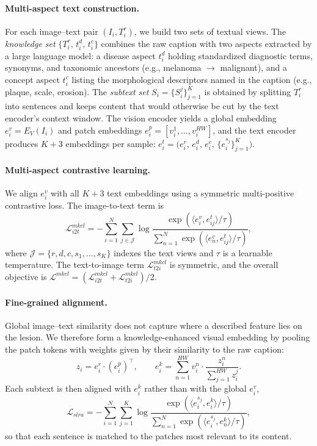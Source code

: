\documentclass{article}
\begin{document}
\paragraph{Multi-aspect text construction.}
For each image--text pair $(I_i, T_i^r)$, we build two sets of textual views. The \emph{knowledge set} $\{T_i^r,\, t_i^d,\, t_i^c\}$ combines the raw caption with two aspects extracted by a large language model: a disease aspect $t_i^d$ holding standardized diagnostic terms, synonyms, and taxonomic ancestors (e.g., melanoma $\rightarrow$ malignant), and a concept aspect $t_i^c$ listing the morphological descriptors named in the caption (e.g., plaque, scale, erosion). The \emph{subtext set} $S_i = \{S_i^j\}_{j=1}^{K}$ is obtained by splitting $T_i^r$ into sentences and keeps content that would otherwise be cut by the text encoder's context window. The vision encoder yields a global embedding $e_i^v = E_V(I_i)$ and patch embeddings $e_i^p = [v_i^1, \ldots, v_i^{HW}]$, and the text encoder produces $K{+}3$ embeddings per sample: $e_i^t = \bigl(e^r_i,\, e^d_i,\, e^c_i,\, \{e^{s_j}_i\}_{j=1}^K\bigr)$.

\paragraph{Multi-aspect contrastive learning.}
We align $e_i^v$ with all $K{+}3$ text embeddings using a symmetric
multi-positive contrastive loss. The image-to-text term is
\begin{equation}
\mathcal{L}_{i2t}^{mkcl} = -\sum_{i=1}^{N}\sum_{j \in \mathcal{J}}
\log \frac{\exp(\langle e_i^v, e_{ij}^t \rangle / \tau)}
         {\sum_{n=1}^{N}\exp(\langle e_n^v, e_{ij}^t \rangle / \tau)},
\end{equation}
where $\mathcal{J} = \{r, d, c, s_1, \ldots, s_K\}$ indexes the text
views and $\tau$ is a learnable temperature. The text-to-image term
$\mathcal{L}_{t2i}^{mkcl}$ is symmetric, and the overall objective is
$\mathcal{L}^{mkcl} = (\mathcal{L}_{i2t}^{mkcl} + \mathcal{L}_{t2i}^{mkcl})/2$.

\paragraph{Fine-grained alignment.}
Global image--text similarity does not capture where a described feature lies on the lesion. We therefore form a knowledge-enhanced visual embedding by pooling the patch tokens with weights given by their similarity to the raw caption:
\begin{equation}
z_i = e_i^r \cdot (e_i^p)^\top,
\qquad
e_i^k = \sum_{n=1}^{HW} v_i^n \cdot
        \frac{z_i^n}{\sum_{j=1}^{HW} z_i^j}.
\end{equation}
Each subtext is then aligned with $e_i^k$ rather than with the global $e_i^v$,
\begin{equation}
\mathcal{L}_{slra} = -\sum_{i=1}^{N}\sum_{j=1}^{K}
\log \frac{\exp(\langle e^{s_j}_i, e_i^k \rangle / \tau)}
         {\sum_{n=1}^{N} \exp(\langle e^{s_j}_i, e_n^k \rangle / \tau)},
\end{equation}
so that each sentence is matched to the patches most relevant to its content.
\end{document}
